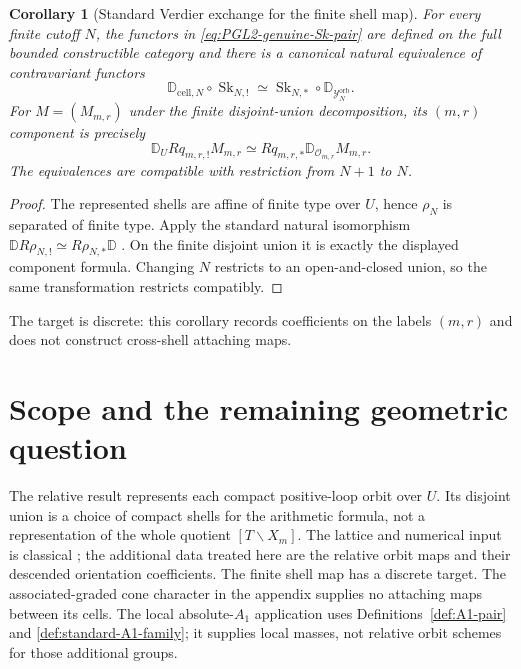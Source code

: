 \documentclass[11pt]{article}
\newtheorem{corollary}[theorem]{Corollary}
\theoremstyle{definition}
\theoremstyle{remark}
\newcommand{\D}{\mathbb D}
\newcommand{\Sk}{\operatorname{Sk}}
\begin{document}
\begin{corollary}[Standard Verdier exchange for the finite shell map]
\label{thm:PGL2-genuine-small-skeletonization}
For every finite cutoff $N$, the functors in
\eqref{eq:PGL2-genuine-Sk-pair} are defined on the full bounded constructible
category and there is a canonical natural equivalence of contravariant
functors
\begin{equation}
 \boxed{
 \D_{\mathrm{cell},N}\circ\Sk_{N,!}
 \simeq
 \Sk_{N,*}\circ\D_{\mathscr Y_N^{\mathrm{orb}}}.}
 \label{eq:PGL2-genuine-small-skeletonization}
\end{equation}
For $M=(M_{m,r})$ under the finite disjoint-union decomposition, its
$(m,r)$ component is precisely
\begin{equation}
 \D_U Rq_{m,r,!}M_{m,r}
 \simeq
 Rq_{m,r,*}\D_{\mathscr O_{m,r}}M_{m,r}.
 \label{eq:PGL2-genuine-component-partner}
\end{equation}
The equivalences are compatible with restriction from $N+1$ to $N$.
\end{corollary}

\begin{proof}
The represented shells are affine of finite type over $U$, hence
$\rho_N$ is separated of finite type.  Apply the standard natural
isomorphism $\D R\rho_{N,!}\simeq R\rho_{N,*}\D$
\cite{LaszloOlsson,LiuZhengEnhanced}.  On the finite disjoint union it is
exactly the displayed component formula.  Changing $N$ restricts to an
open-and-closed union, so the same transformation restricts compatibly.
\end{proof}

The target is discrete: this corollary records coefficients on the labels
$(m,r)$ and does not construct cross-shell attaching maps.

\section{Scope and the remaining geometric question}
\label{sec:literature-outlook}

The relative result represents each compact positive-loop orbit over $U$.
Its disjoint union is a choice of compact shells for the arithmetic
formula, not a representation of the whole quotient $[T\backslash X_m]$.
The lattice and numerical input is classical
\cite{YunOrbitalOrders,KottwitzOrbital}; the additional data treated here
are the relative orbit maps and their descended orientation coefficients.
The finite shell map has a discrete target.  The associated-graded cone
character in the appendix supplies no attaching maps between its cells.
The local absolute-$A_1$ application uses
Definitions~\ref{def:A1-pair} and \ref{def:standard-A1-family}; it supplies
local masses, not relative orbit schemes for those additional groups.
\end{document}
